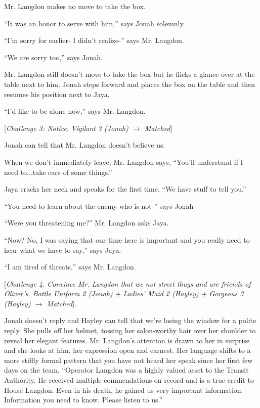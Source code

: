 Mr. Langdon makes no move to take the box.

``It was an honor to serve with him,'' says Jonah solemnly.

``I'm sorry for earlier- I didn't realize-'' says Mr. Langdon.

``We are sorry too,'' says Jonah.

Mr. Langdon still doesn't move to take the box but he flicks a glance over at the table next to him.  Jonah steps forward and places the box on the table and then resumes his position next to Jaya.

``I'd like to be alone now,'' says Mr. Langdon.

{[}\textit{Challenge 3: Notice. }\textit{Vigilant }\textit{3 (Jonah) $\rightarrow$ Matched}{]} 

Jonah can tell that Mr. Langdon doesn't believe us.

When we don't immediately leave, Mr. Langdon says, ``You'll understand if I need to...take care of some things.''

Jaya cracks her neck and speaks for the first time, ``We have stuff to tell you.''

``You need to learn about the enemy who is not-'' says Jonah

``Were you threatening me?'' Mr. Langdon asks Jaya.

``Now?  No, I was saying that our time here is important and you really need to hear what we have to say,'' says Jaya.

``I am tired of threats,'' says Mr. Langdon.

{[}\textit{Challenge 4.  Convince Mr. Langdon that we not street thugs and are friends of Oliver's.  Battle Uniform 2 (Jonah) + Ladies' Maid 2 (Hayley) + Gorgeous 3 (Hayley)  $\rightarrow$ Matched}{]}. 

Jonah doesn't reply and Hayley can tell that we're losing the window for a polite reply.  She pulls off her helmet, tossing her salon-worthy hair over her shoulder to reveal her elegant features.  Mr. Langdon's attention is drawn to her in surprise and she looks at him, her expression open and earnest.  Her language shifts to a more stiffly formal pattern that you have not heard her speak since her first few days on the team.  ``Operator Langdon was a highly valued asset to the Transit Authority.  He received multiple commendations on record and is a true credit to House Langdon.  Even in his death, he gained us very important information.  Information you need to know.  Please listen to us.''





